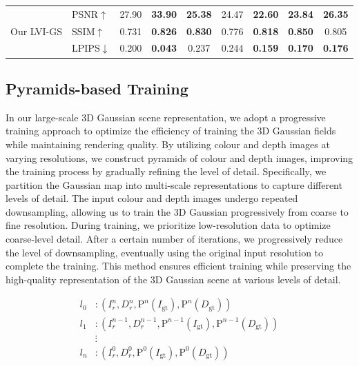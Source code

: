 \documentclass[lettersize,journal]{IEEEtran}
\begin{document}
\begin{table}[htp]
\begin{tabular}{@{}llccccccc@{}}
        \midrule
        \multirow{3}{*}{Our LVI-GS} & PSNR$\uparrow$ & 27.90 & \textbf{33.90} & \textbf{25.38} & 24.47 & \textbf{22.60} & \textbf{23.84} & \textbf{26.35} \\
        & SSIM$\uparrow$ & 0.731 & \textbf{0.826} & \textbf{0.830} & 0.776 & \textbf{0.818} & \textbf{0.850} & 0.805 \\
        & LPIPS$\downarrow$ & 0.200 & \textbf{0.043} & 0.237 & 0.244 & \textbf{0.159} & \textbf{0.170} & \textbf{0.176} \\
        \bottomrule
    \end{tabular}
    \captionsetup{justification=centering, labelsep=colon} %
\end{table}


\subsection{Pyramids-based Training}
In our large-scale 3D Gaussian scene representation, we adopt a progressive training approach to optimize the efficiency of training the 3D Gaussian fields while maintaining rendering quality. By utilizing colour and depth images at varying resolutions, we construct pyramids of colour and depth images, improving the training process by gradually refining the level of detail. Specifically, we partition the Gaussian map into multi-scale representations to capture different levels of detail. The input colour and depth images undergo repeated downsampling, allowing us to train the 3D Gaussian progressively from coarse to fine resolution. During training, we prioritize low-resolution data to optimize coarse-level detail. After a certain number of iterations, we progressively reduce the level of downsampling, eventually using the original input resolution to complete the training. This method ensures efficient training while preserving the high-quality representation of the 3D Gaussian scene at various levels of detail.

\begin{equation}
\begin{aligned}
l_0 & :  \left( I_r^n, D_r^n , \mathrm{P}^n (I_\text{gt}), \mathrm{P}^n (D_\text{gt}) \right) \\
l_1 & : \left( I_r^{n-1}, D_r^{n-1}, \mathrm{P}^{n-1} (I_\text{gt}),\mathrm{P}^{n-1} (D_\text{gt}) \right) \\
& \vdots \\
l_n & : \left( I_r^0, D_r^0,  \mathrm{P}^0 (I_\text{gt}), \mathrm{P}^0 (D_\text{gt}) \right)
\end{aligned}
\end{equation}
\end{document}

